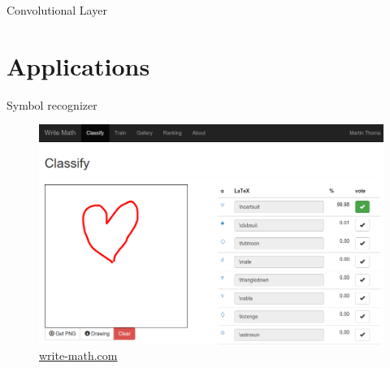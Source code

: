 \documentclass{beamer}
\begin{document}
\begin{frame}{Convolutional Layer}
\begin{figure}[ht]
    \centering
    
\end{figure}
\end{frame}


\section{Applications}
\begin{frame}{Symbol recognizer}
\begin{figure}[ht]
    \centering
    \includegraphics[width=0.8\paperwidth, height=0.7\paperheight, keepaspectratio]{graphics/symbol-recognizer.png}
    \captionsetup{labelformat=empty}
    \caption{\href{http://write-math.com}{write-math.com}}
\end{figure}
\end{frame}

\begin{frame}{}
\inputminted[linenos,
               numbersep=7pt,
               gobble=0,
                fontsize=\footnotesize, tabsize=4]{python}{cnn.py}
\end{frame}
\end{document}
